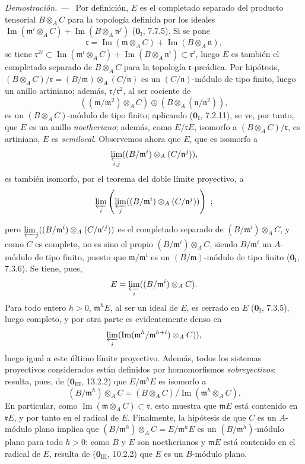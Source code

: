 \documentclass[10pt,oneside]{book}
\newcommand{\oldpage}[2][]{%
  \setcounter{footnote}{0}%
  \marginpar{\scriptsize\textbf{#1}~|~#2}\ignorespaces}
\newenvironment{proof}{%
  \par\medskip\noindent\textit{Demostración. ---\ }}{\par}
\begin{document}
\begin{proof}
Por definición, $E$ es el completado separado del producto tensorial $B\otimes_A C$
para la topología definida por los ideales
$\operatorname{Im}(\mathfrak m^i\otimes_A C)+
\operatorname{Im}(B\otimes_A\mathfrak n^j)$
($\mathbf 0_{\mathrm I}$, 7.7.5). Si se pone
\[
  \mathfrak r=\operatorname{Im}(\mathfrak m\otimes_A C)+
  \operatorname{Im}(B\otimes_A\mathfrak n),
\]
se tiene
$\mathfrak r^{2i}\subset
\operatorname{Im}(\mathfrak m^i\otimes_A C)+
\operatorname{Im}(B\otimes_A\mathfrak n^i)\subset\mathfrak r^i$, luego $E$
es también el completado separado de $B\otimes_A C$ para la topología
$\mathfrak r$-preádica. Por hipótesis,
$(B\otimes_A C)/\mathfrak r=(B/\mathfrak m)\otimes_A(C/\mathfrak n)$ es un
$(C/\mathfrak n)$-módulo de tipo finito, luego un anillo artiniano; además,
$\mathfrak r/\mathfrak r^2$, al ser cociente de
\[
  ((\mathfrak m/\mathfrak m^2)\otimes_A C)
  \oplus(B\otimes_A(\mathfrak n/\mathfrak n^2)),
\]
es un $(B\otimes_A C)$-módulo de tipo finito; aplicando
($\mathbf 0_{\mathrm I}$, 7.2.11), se ve, por tanto, que $E$ es un anillo
\emph{noetheriano}; además, como $E/\mathfrak rE$, isomorfo a
$(B\otimes_A C)/\mathfrak r$, es artiniano, $E$ es \emph{semilocal}.
Observemos ahora que $E$, que es isomorfo a
\[
  \varprojlim_{i,j}((B/\mathfrak m^i)\otimes_A(C/\mathfrak n^j)),
\]
es también isomorfo, por el teorema del doble límite proyectivo, a
\[
  \varprojlim_i\left(\varprojlim_j
  ((B/\mathfrak m^i)\otimes_A(C/\mathfrak n^j))\right)~;
\]

\oldpage[0\textsubscript{IV-1}]{106}

pero $\varprojlim_j((B/\mathfrak m^i)\otimes_A(C/\mathfrak n'{}^j))$ es el
completado separado de $(B/\mathfrak m^i)\otimes_A C$, y como $C$ es completo,
no es sino el propio $(B/\mathfrak m^i)\otimes_A C$,
siendo $B/\mathfrak m^i$ un $A$-módulo de tipo finito, puesto que
$\mathfrak m/\mathfrak m^i$ es un $(B/\mathfrak m)$-módulo de tipo finito
($\mathbf 0_{\mathrm I}$, 7.3.6). Se tiene, pues,
\[
  E=\varprojlim_i((B/\mathfrak m^i)\otimes_A C).
\]
Para todo entero $h>0$, $\mathfrak m^hE$, al ser un ideal de $E$, es cerrado
en $E$ ($\mathbf 0_{\mathrm I}$, 7.3.5), luego completo, y por otra parte es
evidentemente denso en
\[
  \varprojlim_i
  (\operatorname{Im}(\mathfrak m^h/\mathfrak m^{h+i})\otimes_A C)),
\]
luego igual a este último límite proyectivo. Además, todos los sistemas
proyectivos considerados están definidos por homomorfismos \emph{sobreyectivos};
resulta, pues, de ($\mathbf 0_{\mathrm{III}}$, 13.2.2) que
$E/\mathfrak m^hE$ es isomorfo a
\[
  (B/\mathfrak m^h)\otimes_A C
  =(B\otimes_A C)/\operatorname{Im}(\mathfrak m^h\otimes_A C).
\]
En particular, como
$\operatorname{Im}(\mathfrak m\otimes_A C)\subset\mathfrak r$, esto muestra
que $\mathfrak mE$ está contenido en $\mathfrak rE$, y por tanto en el radical de
$E$. Finalmente, la hipótesis de que $C$ es un $A$-módulo plano implica que
$(B/\mathfrak m^h)\otimes_A C=E/\mathfrak m^hE$ es un
$(B/\mathfrak m^h)$-módulo plano para todo $h>0$: como $B$ y $E$ son
noetherianos y $\mathfrak mE$ está contenido en el radical de $E$,
resulta de ($\mathbf 0_{\mathrm{III}}$, 10.2.2) que $E$ es un $B$-módulo
plano.
\end{proof}
\end{document}

